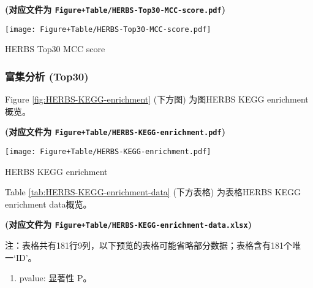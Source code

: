 \documentclass[
]{article}
\providecommand{\tightlist}{%
  \setlength{\itemsep}{0pt}\setlength{\parskip}{0pt}}
\begin{document}
\textbf{(对应文件为 \texttt{Figure+Table/HERBS-Top30-MCC-score.pdf})}

\def\@captype{figure}
\begin{center}
\texttt{[image: Figure+Table/HERBS-Top30-MCC-score.pdf]}
\caption{HERBS Top30 MCC score}\label{fig:HERBS-Top30-MCC-score}
\end{center}

\hypertarget{ux5bccux96c6ux5206ux6790-top30}{%
\subsubsection{富集分析 (Top30)}\label{ux5bccux96c6ux5206ux6790-top30}}

Figure \ref{fig:HERBS-KEGG-enrichment} (下方图) 为图HERBS KEGG enrichment概览。

\textbf{(对应文件为 \texttt{Figure+Table/HERBS-KEGG-enrichment.pdf})}

\def\@captype{figure}
\begin{center}
\texttt{[image: Figure+Table/HERBS-KEGG-enrichment.pdf]}
\caption{HERBS KEGG enrichment}\label{fig:HERBS-KEGG-enrichment}
\end{center}

Table \ref{tab:HERBS-KEGG-enrichment-data} (下方表格) 为表格HERBS KEGG enrichment data概览。

\textbf{(对应文件为 \texttt{Figure+Table/HERBS-KEGG-enrichment-data.xlsx})}

\begin{center}\begin{tcolorbox}[colback=gray!10, colframe=gray!50, width=0.9\linewidth, arc=1mm, boxrule=0.5pt]注：表格共有181行9列，以下预览的表格可能省略部分数据；表格含有181个唯一`ID'。
\end{tcolorbox}
\end{center}
\begin{center}\begin{tcolorbox}[colback=gray!10, colframe=gray!50, width=0.9\linewidth, arc=1mm, boxrule=0.5pt]\begin{enumerate}\tightlist
\item pvalue:  显著性 P。
\end{enumerate}\end{tcolorbox}
\end{center}
\end{document}
